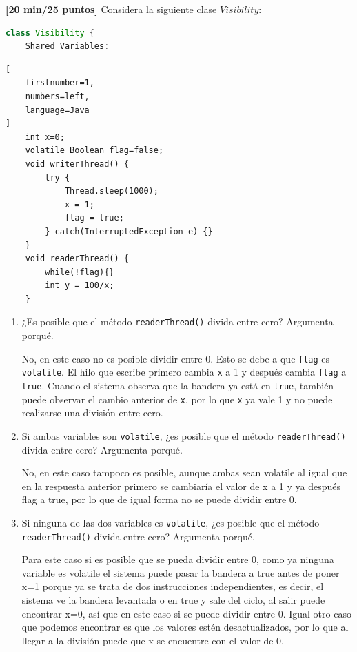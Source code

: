 
\item[\textbf{6.}] \textbf{[20 min/25 puntos]} \textcolor{dkgreen}{Considera la siguiente clase $Visibility$:}\\
\par
\begin{lstlisting}[numbers=none,language=Java,caption=Clase "VisibilityField"]
class Visibility {
    Shared Variables:
\end{lstlisting}

\begin{lstlisting}[
    firstnumber=1,
    numbers=left,
    language=Java
]
    int x=0;
    volatile Boolean flag=false;
    void writerThread() {
        try {
            Thread.sleep(1000);
            x = 1;
            flag = true;
        } catch(InterruptedException e) {}
    }
    void readerThread() {
        while(!flag){}
        int y = 100/x;
    }
\end{lstlisting}

\begin{enumerate}
    \item \textcolor{dkgreen}{¿Es posible que el método \texttt{readerThread()} divida entre cero? Argumenta porqué.}

    No, en este caso no es posible dividir entre 0. Esto se debe a que \texttt{flag} es \texttt{volatile}. El hilo que escribe primero cambia \texttt{x} a 1 y después cambia \texttt{flag} a \texttt{true}. Cuando el sistema observa que la bandera ya está en \texttt{true}, también puede observar el cambio anterior de \texttt{x}, por lo que \texttt{x} ya vale 1 y no puede realizarse una división entre cero.

    
    \item \textcolor{dkgreen}{Si ambas variables son \texttt{volatile}, ¿es posible que el método \texttt{readerThread()} divida entre cero? Argumenta porqué.}

    No, en este caso tampoco es posible, aunque ambas sean volatile al igual que en la respuesta anterior primero se cambiaría el valor de x a 1 y ya después flag a true, por lo que de igual forma no se puede dividir entre 0. 

    \item \textcolor{dkgreen}{Si ninguna de las dos variables es \texttt{volatile}, ¿es posible que el método \texttt{readerThread()} divida entre cero? Argumenta porqué.}

    Para este caso si es posible que se pueda dividir entre 0, como ya ninguna variable es volatile el sistema puede pasar la bandera a true antes de poner x=1 porque ya se trata de dos instrucciones independientes, es decir, el sistema ve la bandera levantada o en true y sale del ciclo, al salir puede encontrar x=0, así que en este caso si se puede dividir entre 0. Igual otro caso que podemos encontrar es que los valores estén desactualizados, por lo que al llegar a la división puede que x se encuentre con el valor de 0. 

\end{enumerate}